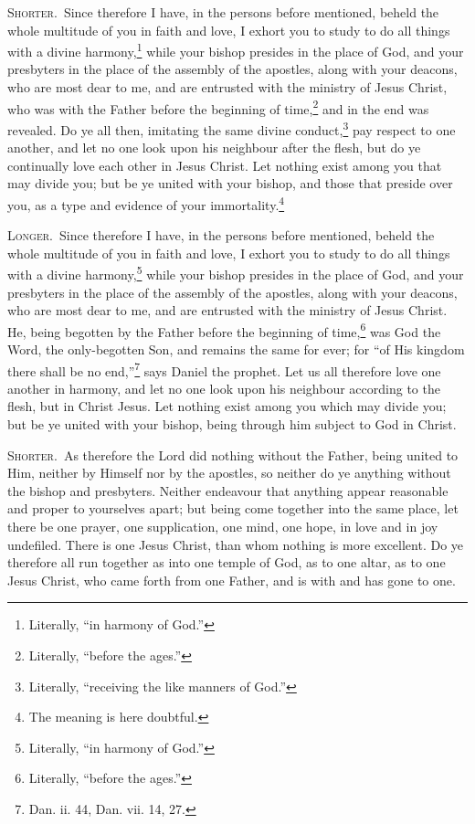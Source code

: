 
\textsc{Shorter.}~Since therefore I have, in the persons before mentioned, beheld the whole multitude of you in faith and love, I exhort you to study to do all things with a divine harmony,\footnote{Literally, “in harmony of God.”} while your bishop presides in the place of God, and your presbyters in the place of the assembly of the apostles, along with your deacons, who are most dear to me, and are entrusted with the ministry of Jesus Christ, who was with the Father before the beginning of time,\footnote{Literally, “before the ages.”} and in the end was revealed. Do ye all then, imitating the same divine conduct,\footnote{Literally, “receiving the like manners of God.”} pay respect to one another, and let no one look upon his neighbour after the flesh, but do ye continually love each other in Jesus Christ. Let nothing exist among you that may divide you; but be ye united with your bishop, and those that preside over you, as a type and evidence of your immortality.\footnote{The meaning is here doubtful.}

\textsc{Longer.}~Since therefore I have, in the persons before mentioned, beheld the whole multitude of you in faith and love, I exhort you to study to do all things with a divine harmony,\footnote{Literally, “in harmony of God.”} while your bishop presides in the place of God, and your presbyters in the place of the assembly of the apostles, along with your deacons, who are most dear to me, and are entrusted with the ministry of Jesus Christ. He, being begotten by the Father before the beginning of time,\footnote{Literally, “before the ages.”} was God the Word, the only-begotten Son, and remains the same for ever; for “of His kingdom there shall be no end,”\footnote{Dan. ii. 44, Dan. vii. 14, 27.} says Daniel the prophet. Let us all therefore love one another in harmony, and let no one look upon his neighbour according to the flesh, but in Christ Jesus. Let nothing exist among you which may divide you; but be ye united with your bishop, being through him subject to God in Christ.


\textsc{Shorter.}~As therefore the Lord did nothing without the Father, being united to Him, neither by Himself nor by the apostles, so neither do ye anything without the bishop and presbyters. Neither endeavour that anything appear reasonable and proper to yourselves apart; but being come together into the same place, let there be one prayer, one supplication, one mind, one hope, in love and in joy undefiled. There is one Jesus Christ, than whom nothing is more excellent. Do ye therefore all run together as into one temple of God, as to one altar, as to one Jesus Christ, who came forth from one Father, and is with and has gone to one.

